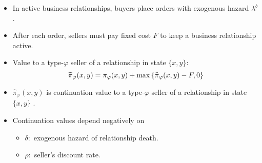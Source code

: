 \documentclass[notes=show]{beamer}
\begin{document}
\begin{frame}%



\begin{itemize}
\item In active business relationships, buyers place orders with exogenous
hazard $\lambda ^{b}$.%
\hyperref{}{}{appendix}{}%

\item After each order, sellers must pay fixed cost $F$ to keep a business
relationship active.

\item Value to a type-$\varphi $ seller of a relationship in state $\{x,y\}$:%
\[
\widetilde{\pi }_{\varphi }(x,y)=\pi _{\varphi }(x,y)+\max \left\{ \widehat{%
\pi }_{\varphi }(x,y)-F,0\right\} 
\]

\item $\widehat{\pi }_{\varphi }(x,y)$ is continuation value to a type-$%
\varphi $ seller of a relationship in state $\{x,y\}$ 
\hyperref{}{}{pihat_derivation}{}%
.

\item Continuation values depend negatively on

\begin{itemize}
\item $\delta :$ exogenous hazard of relationship death.

\item $\rho :$ seller's discount rate.
\end{itemize}
\end{itemize}

\end{frame}%
\end{document}
